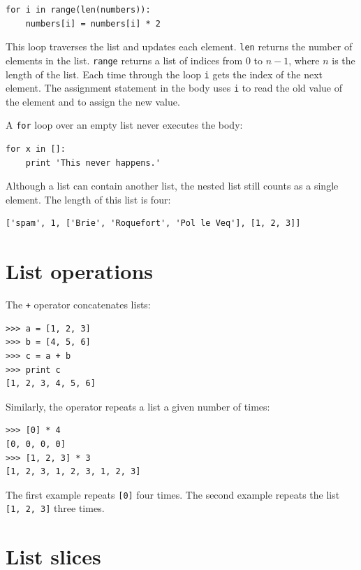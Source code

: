 \documentclass[10pt]{book}
\begin{document}
\begin{verbatim}
for i in range(len(numbers)):
    numbers[i] = numbers[i] * 2
\end{verbatim}
%
This loop traverses the list and updates each element.  {\tt len}
returns the number of elements in the list.  {\tt range} returns
a list of indices from 0 to $n-1$, where $n$ is the length of
the list.  Each time through the loop {\tt i} gets the index
of the next element.  The assignment statement in the body uses
{\tt i} to read the old value of the element and to assign the
new value.

A {\tt for} loop over an empty list never executes the body:

\begin{verbatim}
for x in []:
    print 'This never happens.'
\end{verbatim}
%
Although a list can contain another list, the nested
list still counts as a single element.  The length of this list is
four:

\begin{verbatim}
['spam', 1, ['Brie', 'Roquefort', 'Pol le Veq'], [1, 2, 3]]
\end{verbatim}



\section{List operations}

The {\tt +} operator concatenates lists:

\begin{verbatim}
>>> a = [1, 2, 3]
>>> b = [4, 5, 6]
>>> c = a + b
>>> print c
[1, 2, 3, 4, 5, 6]
\end{verbatim}
%
Similarly, the {\tt *} operator repeats a list a given number of times:

\begin{verbatim}
>>> [0] * 4
[0, 0, 0, 0]
>>> [1, 2, 3] * 3
[1, 2, 3, 1, 2, 3, 1, 2, 3]
\end{verbatim}
%
The first example repeats {\tt [0]} four times.  The second example
repeats the list {\tt [1, 2, 3]} three times.


\section{List slices}
\end{document}
